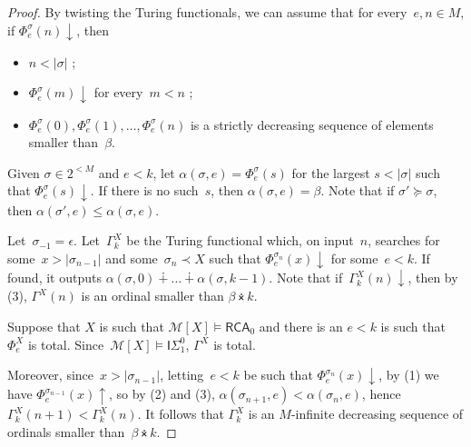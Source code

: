 \documentclass{article}
\numberwithin{theorem}{section}
\newtheorem{lemma}[theorem]{Lemma}
\newcommand{\RCA}{\mathsf{RCA}}
\newcommand{\ISig}{\mathsf{I}\Sigma^0}
\newcommand{\M}{\mathcal{M}}
\newcommand{\nplus}{\dotplus}
\newcommand{\ntimes}{\dottimes}
\begin{document}

\begin{proof}
By twisting the Turing functionals, we can assume that for every~$e, n \in M$, if $\Phi^\sigma_e(n)\downarrow$, then
\begin{itemize}
    \item[(1)] $n < |\sigma|$ ;
    \item[(2)] $\Phi^\sigma_e(m)\downarrow$ for every~$m < n$ ;
    \item[(3)] $\Phi^\sigma_e(0), \Phi^\sigma_e(1), \dots, \Phi^\sigma_e(n)$ is a strictly decreasing sequence of elements smaller than~$\beta$.
\end{itemize}

Given $\sigma \in 2^{<M}$ and $e < k$, let $\alpha(\sigma, e) = \Phi^{\sigma}_e(s)$ for the largest $s < |\sigma|$ such that $\Phi^{\sigma}_e(s)\downarrow$. If there is no such~$s$, then $\alpha(\sigma, e) = \beta$. Note that if $\sigma' \succeq \sigma$, then $\alpha(\sigma',e) \leq \alpha(\sigma,e)$.

Let~$\sigma_{-1} = \epsilon$.
Let~$\Gamma^X_k$ be the Turing functional which, on input~$n$, searches for some~$x > |\sigma_{n-1}|$ and some~$\sigma_n \prec X$ such that $\Phi_e^{\sigma_n}(x)\downarrow$ for some~$e < k$. If found, it outputs $\alpha(\sigma, 0) \nplus \dots \nplus \alpha(\sigma, k-1)$. Note that if~$\Gamma^X_k(n)\downarrow$, then by (3), $\Gamma^X(n)$ is an ordinal smaller than $\beta \ntimes k$.

Suppose that $X$ is such that $\M[X] \models \RCA_0$ and there is an $e < k$ is such that $\Phi_e^X$ is total.
Since~$\M[X] \models \ISig_1$, $\Gamma^X$ is total.

Moreover, since~$x > |\sigma_{n-1}|$, letting~$e < k$ be such that $\Phi_e^{\sigma_n}(x)\downarrow$, by (1) we have $\Phi_e^{\sigma_{n-1}}(x)\uparrow$, so by (2) and (3), $\alpha(\sigma_{n+1},e) < \alpha(\sigma_n, e)$, hence $\Gamma^X_k(n+1) < \Gamma^X_k(n)$. It follows that $\Gamma^X_k$ is an $M$-infinite decreasing sequence of ordinals smaller than~$\beta \ntimes k$.
\end{proof}
\end{document}
